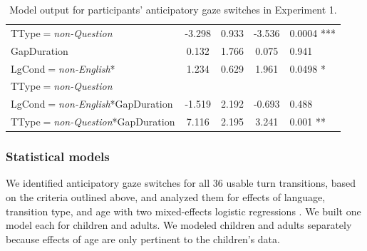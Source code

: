\documentclass[authoryear, 12pt]{elsarticle}
\begin{document}
\begin{table}[h!]
\begin{small}
\begin{center}
\begin{tabular}{lcccl}
    TType$=$\textit{non-Question}							& -3.298   & 0.933 & -3.536 & 0.0004 ***	\\
    GapDuration														&  0.132   & 1.766 &  0.075 & 0.941			\\
    LgCond$=$\textit{non-English}*						&  1.234   & 0.629 &  1.961 & 0.0498 *		\\
    \hspace*{5mm} TType$=$\textit{non-Question} &&&& \\
    LgCond$=$\textit{non-English}*GapDuration		& -1.519   & 2.192 & -0.693 & 0.488			\\
    TType$=$\textit{non-Question}*GapDuration			&  7.116   & 2.195 &  3.241 & 0.001 **		\\
    \hline
  \end{tabular}
\end{center}
  \end{small}
  \caption{Model output for participants' anticipatory gaze switches in Experiment 1.}
\label{tab:E1-models}
\end{table}

\subsubsection*{Statistical models}
\label{sec:models1}

We identified anticipatory gaze switches for all 36 usable turn transitions, based on the criteria outlined above, and analyzed them for effects of language, transition type, and age with two mixed-effects logistic regressions \citep{lme4, R}. We built one model each for children and adults. We modeled children and adults separately because effects of age are only pertinent to the children's data.
\end{document}
